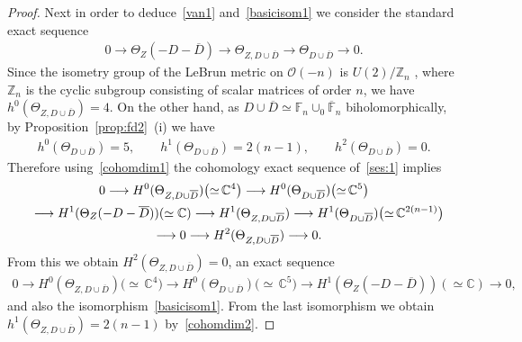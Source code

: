 \begin{proof}
Next in order to deduce~\eqref{van1} and~\eqref{basicisom1} we consider the standard exact sequence
\begin{gather}
\label{ses:1}
0
\longrightarrow
\Theta_Z(-D-\overline D)
\longrightarrow
\Theta_{Z, D\cup\overline D}
\longrightarrow
\Theta_{D\cup \overline D}
\longrightarrow
0.
\end{gather}
Since the isometry group of the LeBrun metric on $\mathscr O(-n)$ is $U(2)/\mathbb{Z}_n$ \cite{LB88}, where
$\mathbb{Z}_n$ is the cyclic subgroup consisting of scalar matrices of order $n$, we have $ h^0 ( \Theta_{Z,
D\cup\overline D}) = 4.
$ On the other hand, as $D\cup \overline D\simeq \mathbb{F}_n\cup_0\overline{\mathbb{F}}_n$ biholomorphically, by
Proposition~\ref{prop:fd2}~(i) we have
\begin{gather}
\label{cohomdim2}
h^0 ( \Theta_{D\cup\overline D}) = 5,
\qquad
h^1 ( \Theta_{D\cup\overline D}) = 2(n-1),
\qquad
h^2 ( \Theta_{D\cup\overline D}) = 0.
\end{gather}
Therefore using~\eqref{cohomdim1} the cohomology exact sequence of~\eqref{ses:1} implies
\begin{gather}
\label{les:1}
0
\longrightarrow
H^0(\Theta_{Z, D\cup\overline D})
\big({\simeq}\,\mathbb{C}^4\big)
\longrightarrow
H^0(\Theta_{D\cup \overline D})
\big({\simeq}\, \mathbb{C}^5\big)
\nonumber
\\
\hphantom{0}{}
\longrightarrow
H^1(\Theta_Z(-D-\overline D))
(\simeq \mathbb{C})
\longrightarrow
H^1(\Theta_{Z, D\cup\overline D})
\longrightarrow
H^1(\Theta_{D\cup \overline D})
\big({\simeq}\, \mathbb{C}^{2(n-1)}\big)
\nonumber
\\
\hphantom{0}{}
\longrightarrow
0
\longrightarrow
H^2(\Theta_{Z, D\cup\overline D})
\longrightarrow
0.
\end{gather}
From this we obtain $H^2( \Theta_{Z, D\cup\overline D}) = 0$, an exact sequence
\begin{gather}
\label{LB:key}
0
\longrightarrow
H^0(\Theta_{Z,D\cup\overline D})
\big({\simeq}\, \mathbb{C}^4\big)
\longrightarrow
H^0(\Theta_{D\cup \overline D})
\big({\simeq}\, \mathbb{C}^5\big)
\longrightarrow
H^1( \Theta_Z(-D-\overline D))
(\simeq \mathbb{C})
\longrightarrow
0,\!\!\!\!
\end{gather}
and also the isomorphism~\eqref{basicisom1}.
From the last isomorphism we obtain $h^1(\Theta_{Z,D\cup\overline D}) = 2(n-1)$ by~\eqref{cohomdim2}.


\end{proof}
